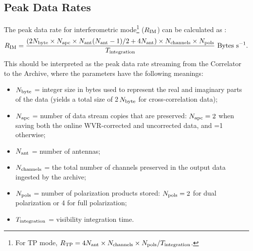 \subsection{Peak Data Rates}
\label{subsec:datarates_peak}
The  peak data rate for interferometric mode\footnote{For TP mode, $R_{\rm TP} = 4N_{\rm ant} \times N_{\rm channels} \times N_{\rm pols} / T_{\rm integration}$.} ($R_{\rm IM}$) can be calculated as \cite{drru_peak}: 
\begin{equation}
\label{eq:peakDataRate}
    R_{\rm IM} = \frac{(2N_{\rm byte} \times N_{\rm apc} \times N_{\rm ant}(N_{\rm ant}-1)/2 +4N_{\rm ant}) \times N_{\rm channels} \times N_{\rm pols}}{T_{\rm integration}} \,\,{\rm Bytes\ s^{-1}}.
\end{equation}
This should be interpreted as the peak data rate streaming from the Correlator to the  Archive, where the parameters have the following meanings:
\begin{itemize}[itemsep=-0.5em]
        \item $N_{\rm byte}$ = integer size in bytes used to represent the real and imaginary parts of the data (yields a total size of 2\,$N_{\rm byte}$ for cross-correlation data);
    \item $N_{\rm apc}$ = number of data stream copies that are preserved: $N_{\rm apc}=2$ when saving both the online WVR-corrected and uncorrected data, and =1 otherwise;
    \item $N_{\rm ant}$ = number of antennas;
    \item $N_{\rm channels}$ = the total number of channels preserved in the output data ingested by the archive;
    \item $N_{\rm pols}$ = number of polarization products stored: $N_{\rm pols}=2$ for dual polarization or 4 for full polarization;
    \item $T_{\rm integration}$ = visibility integration time.
    \end{itemize}

